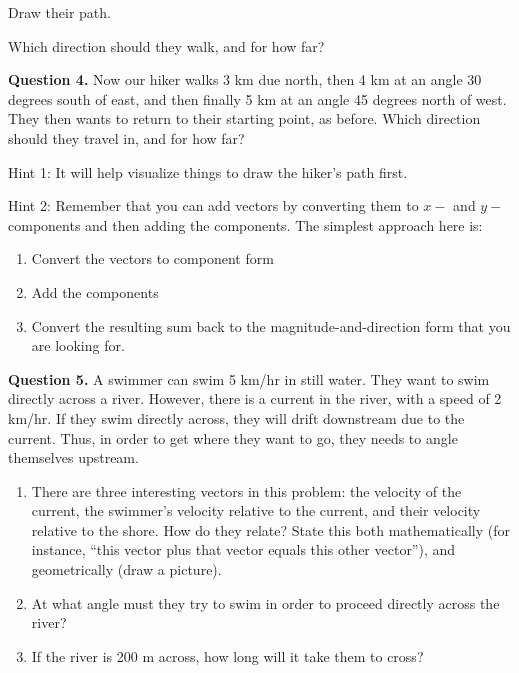 \documentclass[12pt]{article}
\begin{document}
Draw their path. 








\vspace{3in}

Which direction should they walk, and for how far?










\newpage
{\bf Question 4.} Now our hiker walks 3 km due north, then 4 km at an angle 30 degrees south of east, and then finally 5 km at an angle 45 degrees north of west. They then wants to return to their starting point, as before. Which direction should they travel in, and for how far? 

Hint 1: It will help visualize things to draw the hiker's path first.

Hint 2: Remember that you can add vectors by converting them to $x-$ and $y-$components and then adding the components. The simplest approach here is:

\begin{enumerate}
	\item Convert the vectors to component form
	\item Add the components
	\item Convert the resulting sum back to the magnitude-and-direction form that you are looking for.
\end{enumerate}

\newpage
{\bf Question 5.} A swimmer can swim 5 km/hr in still water. They want to swim directly across a river. However, there is a current in the river, with a speed of 2 km/hr. If they swim directly across, they will drift downstream due to the current. Thus, in order to get where they want to go, they needs to angle themselves upstream.

\begin{enumerate}
\item There are three interesting vectors in this problem: the velocity of the current, the swimmer's velocity relative to the current, and their velocity relative to the shore. How do they relate? State this both mathematically (for instance, ``this vector plus that vector equals this other vector''), and geometrically (draw a picture).
\vspace{3in}











\item At what angle must they try to swim in order to proceed directly across the river?





\vspace{1.5in}




\item If the river is 200 m across, how long will it take them to cross?

\end{enumerate}
\end{document}
